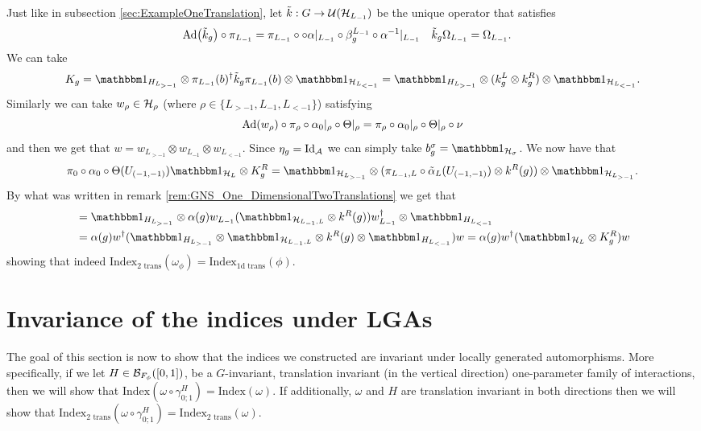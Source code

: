 \documentclass[11pt,a4paper,twoside]{article}
\numberwithin{equation}{section}
\begin{document}
	Just like in subsection \ref{sec:ExampleOneTranslation}, let $\tilde k:G\rightarrow \UU(\HH_{L_{-1}})$ be the unique operator that satisfies
	\begin{align}
		\Ad{\tilde{k}_g}\circ\pi_{L_{-1}}&=\pi_{L_{-1}}\circ \circ\alpha|_{L_{-1}}\circ\beta_g^{L_{-1}}\circ \alpha^{-1}|_{L_{-1}}&\tilde k_g\Omega_{L_{-1}}&=\Omega_{L_{-1}}.
	\end{align}
	We can take
	\begin{equation}
		K_g=\id_{H_{L_{>-1}}}\otimes \pi_{L_{-1}}(b)^\dagger \tilde k_g \pi_{L_{-1}}(b) \otimes\id_{\HH_{L_{<-1}}} =\id_{H_{L_{>-1}}}\otimes (k_g^L\otimes k_g^R) \otimes\id_{\HH_{L_{<-1}}}.
	\end{equation}
	Similarly we can take $w_\rho\in\HH_\rho$ (where $\rho\in\{L_{>-1},L_{-1},L_{<-1}\}$) satisfying
	\begin{equation}
		\Ad{w_\rho}\circ\pi_\rho\circ\alpha_{0}|_\rho\circ\Theta|_\rho=\pi_\rho\circ\alpha_{0}|_\rho\circ\Theta|_\rho\circ\nu
	\end{equation}
	and then we get that $w=w_{L_{>-1}}\otimes w_{L_{-1}}\otimes w_{L_{<-1}}$. Since $\eta_g=\textrm{Id}_{\AA}$ we can simply take $b_g^\sigma=\id_{\HH_\sigma}$. We now have that
	\begin{equation}
		\pi_0\circ\alpha_0\circ\Theta(U_{(-1,-1)})\id_{\HH_L}\otimes K_g^R=\id_{\HH_{L_{>-1}}}\otimes(\pi_{L_{-1},L}\circ\tilde\alpha_L(U_{(-1,-1)})\otimes k^R(g))\otimes\id_{\HH_{L_{>-1}}}.
	\end{equation}
	By what was written in remark \ref{rem:GNS_One_DimensionalTwoTranslations} we get that
	\begin{align}
		&=\id_{H_{L_{>-1}}}\otimes\alpha(g) w_{L_{-1}}(\id_{\HH_{L_{-1},L}}\otimes k^R(g))w_{L_{-1}}^\dagger\otimes \id_{H_{L_{<-1}}}\\
		&=\alpha(g)w^\dagger (\id_{H_{L_{>-1}}}\otimes \id_{\HH_{L_{-1},L}}\otimes k^R(g)\otimes \id_{H_{L_{<-1}}}) w=\alpha(g)w^\dagger (\id_{\HH_L}\otimes K^R_g) w
	\end{align}
	showing that indeed $\textrm{Index}_{\text{2 trans}}(\omega_\phi)=\textrm{Index}_{\text{1d trans}}(\phi)$.
	\section{Invariance of the indices under LGAs}\label{sec:AllIndicesInvariantUnderLGA}
	The goal of this section is now to show that the indices we constructed are invariant under locally generated automorphisms. More specifically, if we let $H\in\BB_{F_\phi}([0,1])$, be a $G$-invariant, translation invariant (in the vertical direction) one-parameter family of interactions, then we will show that $\textrm{Index}(\omega\circ\gamma^H_{0;1})=\textrm{Index}(\omega)$. If additionally, $\omega$ and $H$ are translation invariant in both directions then we will show that $\textrm{Index}_{\text{2 trans}}(\omega\circ\gamma^H_{0;1})=\textrm{Index}_{\text{2 trans}}(\omega)$.
\end{document}

